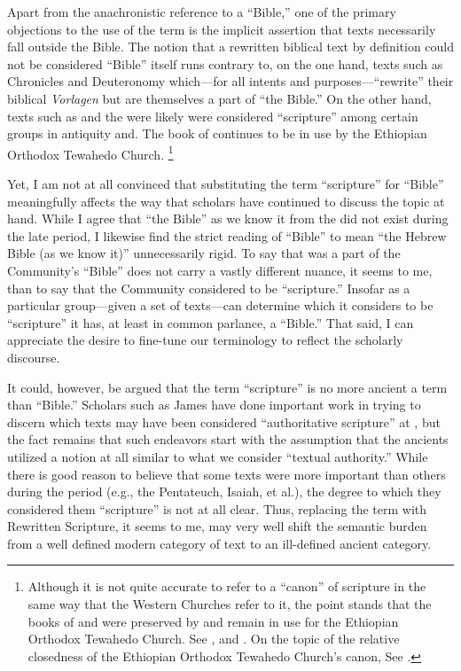 Apart from the anachronistic reference to a ``Bible,'' one of the primary objections to the use of the term \rwb is the implicit assertion that \rwb texts necessarily fall outside the Bible.%
    \autocite[61]{campbell_zsengeller2014}
The notion that a rewritten biblical text by definition could not be considered ``Bible'' itself runs contrary to, on the one hand, texts such as Chronicles and Deuteronomy which---for all intents and purposes---``rewrite'' their biblical \emph{Vorlagen} but are themselves a part of ``the Bible.'' On the other hand, texts such as \jub and the \templescroll were likely were considered ``scripture'' among certain groups in antiquity and. The book of \jub continues to be in use by the Ethiopian Orthodox Tewahedo Church.%
    \footnote{%
        Although it is not quite accurate to refer to a ``canon'' of scripture in the same way that the Western Churches refer to it, the point stands that the books of \enoch and \jub were preserved by and remain in use for the Ethiopian Orthodox Tewahedo Church. See 
        \cite{baynes_mason-etal2012}, 
        \cite{asale_js2013} and 
        \cite{cowley_os1974}. On the topic of the relative closedness of the Ethiopian Orthodox Tewahedo Church's canon, See 
        \cite{asale_bt2016}.}

Yet, I am not at all convinced that substituting the term ``scripture'' for ``Bible'' meaningfully affects the way that scholars have continued to discuss the topic at hand. While I agree that ``the Bible'' as we know it from the  did not exist during the late \secondtemple period, I likewise find the strict reading of ``Bible'' to mean ``the Hebrew Bible (as we know it)'' unnecessarily rigid. To say that \jub was a part of the \qumran Community's ``Bible'' does not carry a vastly different nuance, it seems to me, than to say that the \qumran Community considered \jub to be ``scripture.'' Insofar as a particular group---given a set of texts---can determine which it considers to be ``scripture'' it has, at least in common parlance, a ``Bible.'' That said, I can appreciate the desire to fine-tune our terminology to reflect the scholarly discourse. 

It could, however, be argued that the term ``scripture'' is no more ancient a term than ``Bible.'' Scholars such as James \vanderkam have done important work in trying to discern which texts may have been considered ``authoritative scripture'' at \qumran,%
    \autocite{vanderkam_dsd1998}
but the fact remains that such endeavors start with the assumption that the ancients utilized a notion at all similar to what we consider ``textual authority.''%
    \autocite{brooke_rev-qumran2012}
While there is good reason to believe that some texts were more important than others during the \secondtemple period (e.g., the Pentateuch, Isaiah, et al.), the degree to which they considered them ``scripture'' is not at all clear. Thus, replacing the term \rwb with Rewritten Scripture, it seems to me, may very well shift the semantic burden from a well defined modern category of text to an ill-defined ancient category. 


